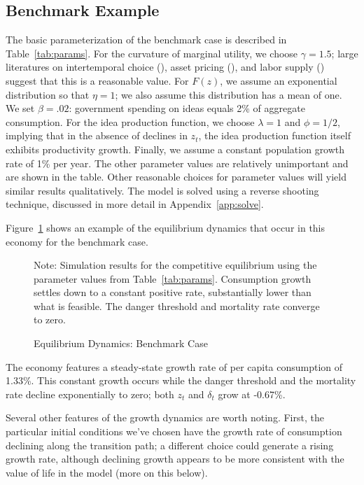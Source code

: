\documentclass[12pt,twoside]{article}
\newcommand{\cnp}[1]{(\citealt{#1})}  %
\newcommand{\fignote}[2]{\begin{center}\parbox[c]{#1}{\footnotesize #2} \end{center}}
\begin{document}
\subsection{Benchmark Example}

The basic parameterization of the benchmark case is described in
Table~\ref{tab:params}. For the curvature of marginal utility, we choose
$\gamma=1.5$; large literatures on intertemporal choice \cnp{Hall:IES},
asset pricing \cnp{Lucas:risk}, and labor supply \cnp{Chetty2006}
suggest that this is a reasonable value. For $F(z)$, we assume an
exponential distribution so that $\eta=1$; we also assume this
distribution has a mean of one. We set $\beta=.02$: government spending
on ideas equals 2\% of aggregate consumption. For the idea production
function, we choose $\lambda=1$ and $\phi=1/2$, implying that in the
absence of declines in $z_t$, the idea production function itself
exhibits productivity growth. Finally, we assume a constant population
growth rate of 1\% per year. The other parameter values are relatively
unimportant and are shown in the table. Other reasonable choices for
parameter values will yield similar results qualitatively. The model is
solved using a reverse shooting technique, discussed in more detail in
Appendix~\ref{app:solve}.\hypertarget{APPB}{}

Figure~\ref{fig:dynamics} shows an example of the equilibrium dynamics
that occur in this economy for the benchmark case.
\begin{figure}[t!p]
\caption{Equilibrium Dynamics: Benchmark Case}
\label{fig:dynamics}
\fignote{4.5in}{Note: Simulation results for the competitive equilibrium
using the parameter values from Table~\ref{tab:params}.  Consumption
growth settles down to a constant positive rate, substantially lower
than what is feasible.  The danger threshold and mortality rate
converge to zero.}
\end{figure} 
The economy features a steady-state growth rate of per capita
consumption of 1.33\%. This constant growth occurs while the danger
threshold and the mortality rate decline exponentially to zero; both
$z_t$ and $\delta_t$ grow at -0.67\%.

Several other features of the growth dynamics are worth noting. First,
the particular initial conditions we've chosen have the growth rate of
consumption declining along the transition path; a different choice
could generate a rising growth rate, although declining growth appears
to be more consistent with the value of life in the model (more on this
below).
\end{document}
